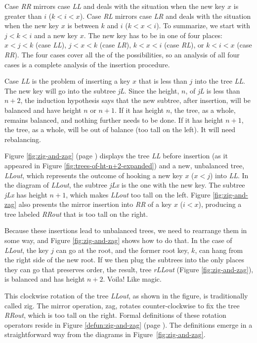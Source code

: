 Case \emph{RR} mirrors
case \emph{LL} and deals with the situation when the new key $x$
is greater than $i$ ($k < i < x$).
Case \emph{RL} mirrors case \emph{LR} and
deals with the situation when the new key $x$
is between $k$ and $i$ ($k < x < i$).
To summarize, we start with $j < k < i$ and
a new key $x$. The new key has to be in one of
four places:
$x < j < k$ (case \emph{LL}),
$j < x < k$ (case \emph{LR}),
$k < x < i$ (case \emph{RL}), or
$k < i < x$ (case \emph{RR}).
The four cases cover all the of the possibilities, so
an analysis of all four cases is a complete analysis
of the insertion procedure.

Case \emph{LL} is the problem of inserting
a key $x$ that is less than $j$
into the tree \emph{LL}.
The new key will go into the subtree \emph{jL}.
Since the height, $n$, of \emph{jL} is less than $n+2$,
the induction hypothesis says that the new subtree,
after insertion,
will be balanced and have height $n$ or $n+1$.
If it has height $n$, the tree, as a whole, remains
balanced, and nothing further needs to be done.
If it has height $n+1$, the tree, as a whole,
will be out of balance (too tall on the left).
It will need rebalancing.

Figure \ref{fig:zig-and-zag} (page \pageref{fig:zig-and-zag})
displays the tree \emph{LL} before insertion
(as it appeared in Figure \ref{fig:trees-of-ht-n+2-expanded})
and a new, unbalanced tree, \emph{LLout}, which represents
the outcome of hooking a new key $x$ ($x < j$) into \emph{LL}.
In the diagram of \emph{LLout}, the subtree
\emph{jLx} is the one with the new key.
The subtree \emph{jLx} has height $n+1$,
which makes \emph{LLout} too tall on the left.
Figure \ref{fig:zig-and-zag} also presents the mirror insertion
into \emph{RR} of a key
$x$ ($i < x$),
producing a tree labeled \emph{RRout}
that is too tall on the right.

Because these insertions lead to unbalanced trees,
we need to rearrange them in some way,
and Figure \ref{fig:zig-and-zag} shows how to do that.
In the case of \emph{LLout},
the key $j$ can go at the root, and the former root key, $k$,
can hang from the right side of the new root.
If we then plug the subtrees into the only places they
can go that preserves order,
the result, tree \emph{rLLout} (Figure \ref{fig:zig-and-zag}),
is balanced and has height $n+2$.
Voila! Like magic.

This clockwise rotation of the tree \emph{LLout},
as shown in the figure,
is traditionally called \textsf{zig}.
The mirror operation, \textsf{zag}, rotates counter-clockwise to fix
the tree \emph{RRout}, which is too tall on the right.
Formal definitions of these rotation operators reside in
Figure \ref{defun:zig-and-zag} (page \pageref{defun:zig-and-zag}).
The definitions emerge in a straightforward way from
the diagrams in Figure~\ref{fig:zig-and-zag}.

